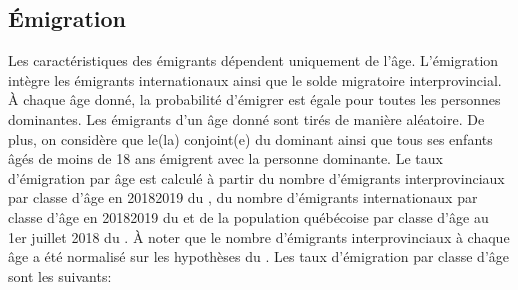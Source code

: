 \documentclass[letterpaper,10pt,french]{sphinxmanual}
\begin{document}
\subsection{Émigration}
\label{\detokenize{methodologie:emigration}}
Les caractéristiques des émigrants dépendent uniquement de l’âge. L’émigration intègre les émigrants internationaux ainsi que le solde migratoire interprovincial. À chaque âge donné, la probabilité d’émigrer est égale pour toutes les personnes dominantes. Les émigrants d’un âge donné sont tirés de manière aléatoire. De plus, on considère que le(la) conjoint(e) du dominant ainsi que tous ses enfants âgés de moins de 18 ans émigrent avec la personne dominante. Le taux d’émigration par âge est calculé à partir du nombre d’émigrants interprovinciaux par classe d’âge en 2018\sphinxhyphen{}2019 du , du nombre d’émigrants internationaux par classe d’âge en 2018\sphinxhyphen{}2019 du  et de la population québécoise par classe d’âge au 1er juillet 2018 du . À noter que le nombre d’émigrants interprovinciaux à chaque âge a été normalisé sur les hypothèses du . Les taux d’émigration par classe d’âge sont les suivants:
\end{document}
